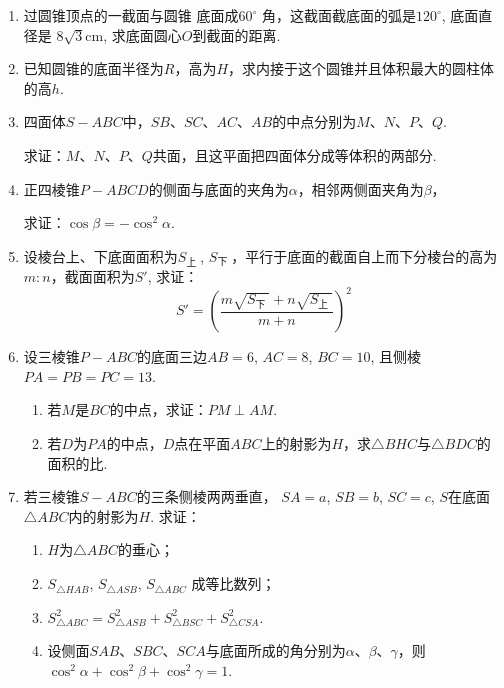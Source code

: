 \begin{enumerate}
\begin{minipage}{.3\textwidth}
\end{minipage}




\item 过圆锥顶点的一截面与圆锥
底面成$60^{\circ}$ 角，这截面截底面的弧是$120^{\circ}$, 底面直径是 $8\sqrt{3}\mathrm{cm}$, 求底面圆心$O$到截面的距离.
\item 
已知圆锥的底面半径为$R$，高为$H$，求内接于这个圆锥并且体积最大的圆柱体的高$h$.
\item 
四面体$S-ABC$中，$SB$、$SC$、$AC$、$AB$的中点分别为$M$、$N$、$P$、$Q$. 

求证：$M$、$N$、$P$、$Q$共面，且这平面把四面体分成等体积的两部分.
\item 
正四棱锥$P-ABCD$的侧面与底面的夹角为$\alpha$，相邻两侧面夹角为$\beta$，

求证：$\cos\beta =-\cos^{2}\alpha$.
\item 
设棱台上、下底面面积为$S_{\text{上 }}$, $S_{\text{下 }}$，平行于底面的截面自上而下分棱台的高为$m:n$，截面面积为$S'$, 求证：
\[S'=\left(\frac{m\sqrt{S_{\text{下 }}}+n\sqrt{S_{\text{上 }}}}{m+n}\right)^{2}\]

\item 
设三棱锥$P-ABC$的底面三边$AB=6$,  $AC=8$,  $BC=10$, 且侧棱 $PA=PB=PC=13$.
\begin{enumerate}[(1)]
\item 若$M$是$BC$的中点，求证：$PM\perp AM$.
\item 若$D$为$PA$的中点，$D$点在平面$ABC$上的射影为$H$，求$\triangle BHC$与$\triangle BDC$的面积的比.
\end{enumerate}

\item 若三棱锥$S-ABC$的三条侧棱两两垂直， $SA=a$,  $SB= b$, $SC=c$,  $S$在底面$\triangle ABC$内的射影为$H$. 求证：
\begin{enumerate}[(1)]
    \item $H$为$\triangle ABC$的垂心；
 \item $S_{\triangle HAB}$,  $S_{\triangle ASB}$,  $S_{\triangle ABC}$ 成等比数列；
  \item $S_{\triangle ABC}^{2}=S_{\triangle ASB}^{2}+S_{\triangle BSC}^{2}+S_{\triangle CSA}^{2}$.
  \item 设侧面$SAB$、$SBC$、$SCA$与底面所成的角分别为$\alpha$、$\beta$、$\gamma$，则$\cos^{2}\alpha+\cos^{2}\beta+\cos^{2}\gamma=1$.
\end{enumerate}



\end{enumerate}

